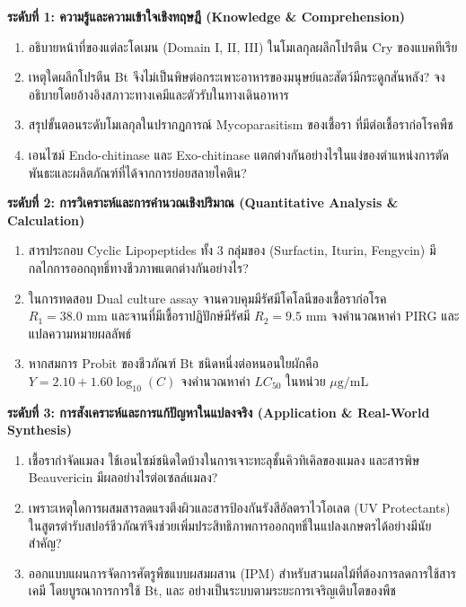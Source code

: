 \noindent \textbf{ระดับที่ 1: ความรู้และความเข้าใจเชิงทฤษฎี (Knowledge \& Comprehension)}
\begin{enumerate}
    \item อธิบายหน้าที่ของแต่ละโดเมน (Domain I, II, III) ในโมเลกุลผลึกโปรตีน Cry ของแบคทีเรีย 
    \item เหตุใดผลึกโปรตีน Bt จึงไม่เป็นพิษต่อกระเพาะอาหารของมนุษย์และสัตว์มีกระดูกสันหลัง? จงอธิบายโดยอ้างอิงสภาวะทางเคมีและตัวรับในทางเดินอาหาร
    \item สรุปขั้นตอนระดับโมเลกุลในปรากฏการณ์ Mycoparasitism ของเชื้อรา  ที่มีต่อเชื้อราก่อโรคพืช
    \item เอนไซม์ Endo-chitinase และ Exo-chitinase แตกต่างกันอย่างไรในแง่ของตำแหน่งการตัดพันธะและผลิตภัณฑ์ที่ได้จากการย่อยสลายไคติน?
\end{enumerate}

\noindent \textbf{ระดับที่ 2: การวิเคราะห์และการคำนวณเชิงปริมาณ (Quantitative Analysis \& Calculation)}
\begin{enumerate}[resume]
    \item สารประกอบ Cyclic Lipopeptides ทั้ง 3 กลุ่มของ  (Surfactin, Iturin, Fengycin) มีกลไกการออกฤทธิ์ทางชีวภาพแตกต่างกันอย่างไร?
    \item ในการทดสอบ Dual culture assay จานควบคุมมีรัศมีโคโลนีของเชื้อราก่อโรค $R_1 = 38.0\text{ mm}$ และจานที่มีเชื้อราปฏิปักษ์มีรัศมี $R_2 = 9.5\text{ mm}$ จงคำนวณหาค่า PIRG และแปลความหมายผลลัพธ์
    \item หากสมการ Probit ของชีวภัณฑ์ Bt ชนิดหนึ่งต่อหนอนใยผักคือ $Y = 2.10 + 1.60 \log_{10}(C)$ จงคำนวณหาค่า $LC_{50}$ ในหน่วย $\mu\text{g/mL}$
\end{enumerate}

\noindent \textbf{ระดับที่ 3: การสังเคราะห์และการแก้ปัญหาในแปลงจริง (Application \& Real-World Synthesis)}
\begin{enumerate}[resume]
    \item เชื้อรากำจัดแมลง  ใช้เอนไซม์ชนิดใดบ้างในการเจาะทะลุชั้นคิวทิเคิลของแมลง และสารพิษ Beauvericin มีผลอย่างไรต่อเซลล์แมลง?
    \item เพราะเหตุใดการผสมสารลดแรงตึงผิวและสารป้องกันรังสีอัลตราไวโอเลต (UV Protectants) ในสูตรตำรับสปอร์ชีวภัณฑ์จึงช่วยเพิ่มประสิทธิภาพการออกฤทธิ์ในแปลงเกษตรได้อย่างมีนัยสำคัญ?
    \item ออกแบบแผนการจัดการศัตรูพืชแบบผสมผสาน (IPM) สำหรับสวนผลไม้ที่ต้องการลดการใช้สารเคมี โดยบูรณาการการใช้ Bt,  และ  อย่างเป็นระบบตามระยะการเจริญเติบโตของพืช
\end{enumerate}
